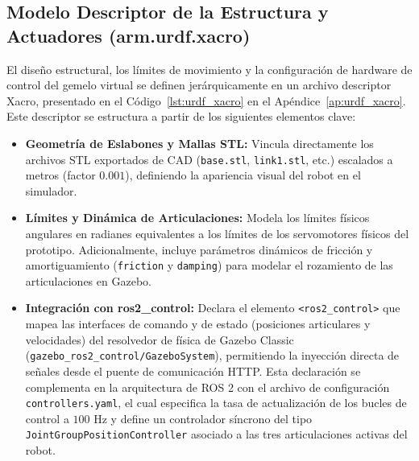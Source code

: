 \documentclass[conference,a4paper]{IEEEtran}
\begin{document}
\subsection{Modelo Descriptor de la Estructura y Actuadores (arm.urdf.xacro)}
El diseño estructural, los límites de movimiento y la configuración de hardware de control del gemelo virtual se definen jerárquicamente en un archivo descriptor Xacro, presentado en el Código~\ref{lst:urdf_xacro} en el Apéndice~\ref{ap:urdf_xacro}.
Este descriptor se estructura a partir de los siguientes elementos clave:
\begin{itemize}
    \item \textbf{Geometría de Eslabones y Mallas STL:} Vincula directamente los archivos STL exportados de CAD (\texttt{base.stl}, \texttt{link1.stl}, etc.) escalados a metros (factor $0.001$), definiendo la apariencia visual del robot en el simulador.
    \item \textbf{Límites y Dinámica de Articulaciones:} Modela los límites físicos angulares en radianes equivalentes a los límites de los servomotores físicos del prototipo. Adicionalmente, incluye parámetros dinámicos de fricción y amortiguamiento (\texttt{friction} y \texttt{damping}) para modelar el rozamiento de las articulaciones en Gazebo.
    \item \textbf{Integración con ros2\_control:} Declara el elemento \texttt{<ros2\_control>} que mapea las interfaces de comando y de estado (posiciones articulares y velocidades) del resolvedor de física de Gazebo Classic (\texttt{gazebo\_ros2\_control/GazeboSystem}), permitiendo la inyección directa de señales desde el puente de comunicación HTTP. Esta declaración se complementa en la arquitectura de ROS 2 con el archivo de configuración \texttt{controllers.yaml}, el cual especifica la tasa de actualización de los bucles de control a $100\text{ Hz}$ y define un controlador síncrono del tipo \texttt{JointGroupPositionController} asociado a las tres articulaciones activas del robot.
\end{itemize}
\end{document}
